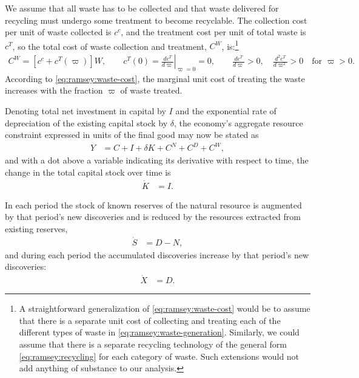 We assume that all waste has to be collected and that waste delivered for recycling must undergo some treatment to become recyclable. The collection cost per unit of waste collected is $c^c$, and the treatment cost per unit of total waste is $c^T$, so the total cost of waste collection and treatment, $C^W$, is:\footnote{A straightforward generalization of \eqref{eq:ramsey:waste-cost} would be to assume that there is a separate unit cost of collecting and treating each of the different types of waste in \eqref{eq:ramsey:waste-generation}. Similarly, we could assume that there is a separate recycling technology of the general form \eqref{eq:ramsey:recycling} for each category of waste. Such extensions would not add anything of substance to our analysis.}
\begin{align}\label{eq:ramsey:waste-cost}
C^W = \left[c^c + c^T(\varpi)\right] W, \qquad c^T(0) = \left.\frac{dc^T}{d\varpi}\right|_{\varpi=0} = 0, \qquad \frac{dc^T}{d\varpi} > 0, \quad \frac{d^2c^T}{d\varpi^2} > 0 \quad \text{for } \varpi > 0.
\end{align}
According to \eqref{eq:ramsey:waste-cost}, the marginal unit cost of treating the waste increases with the fraction $\varpi$ of waste treated.

Denoting total net investment in capital by $I$ and the exponential rate of depreciation of the existing capital stock by $\delta$, the economy's aggregate resource constraint expressed in units of the final good may now be stated as
\begin{align}
Y &= C + I + \delta K + C^N + C^D + C^W,
\label{eq:ramsey:resource-constraint}
\end{align}
and with a dot above a variable indicating its derivative with respect to time, the change in the total capital stock over time is
\begin{align}
\dot{K} &= I.
\label{eq:ramsey:capital-motion}
\end{align}

In each period the stock of known reserves of the natural resource is augmented by that period's new discoveries and is reduced by the resources extracted from existing reserves,
\begin{align}
\dot{S} &= D - N,
\label{eq:ramsey:reserves-motion}
\end{align}
and during each period the accumulated discoveries increase by that period's new discoveries:
\begin{align}
\dot{X} &= D.
\label{eq:ramsey:discoveries-motion}
\end{align}

